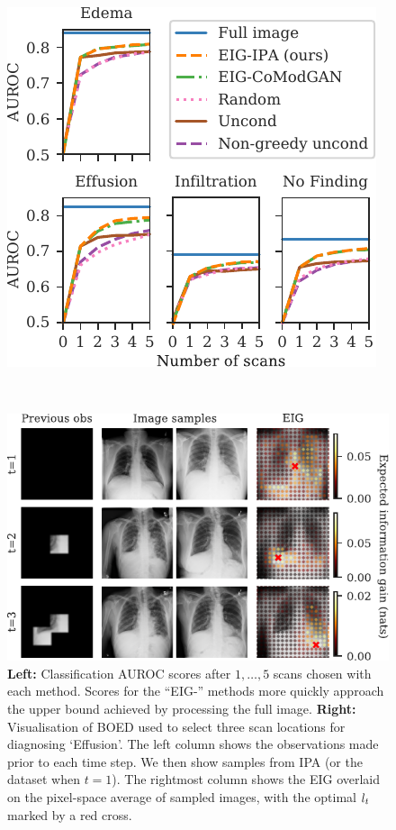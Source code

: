 \begin{figure}[t]
  \centering
  \hspace{-.75cm}
  \begin{minipage}{.4\textwidth}
    \centering
    \includegraphics[scale=.77]{figs/cigcvae/boed-auroc-curve-rearranged}
  \end{minipage}
  ~
  \begin{minipage}{0.54\textwidth}
    \centering
    \includegraphics[scale=.77]{figs/cigcvae/shrunk-boed-vis}
  \end{minipage}
  \caption{\textbf{Left:} Classification AUROC scores after $1,\ldots,5$ scans
    chosen with each method. Scores for the ``EIG-'' methods more quickly approach the
    upper bound achieved by processing the full image. \textbf{Right:}
    Visualisation of BOED used to select three scan locations for diagnosing
    `Effusion'. The left column shows the observations made prior to each time
    step. We then show samples from IPA (or the dataset when $t=1$). The
    rightmost column shows the EIG overlaid on the pixel-space average of
    sampled images, with the optimal $l{}_t$ marked by a red cross.}
  \label{fig:boed}
  \vspace{-.4cm}
\end{figure}



